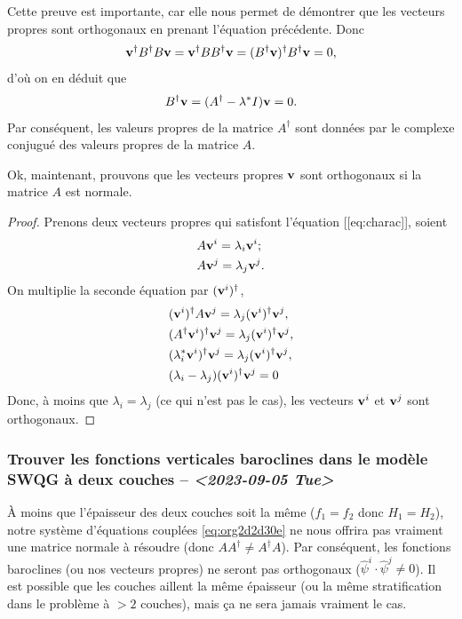 \documentclass[10pt]{article}
\numberwithin{equation}{section}
\newcommand{\vv}{\vb{v}}
\begin{document}
Cette preuve est importante, car elle nous permet de démontrer que les vecteurs propres sont orthogonaux en prenant l'équation précédente.
Donc
\begin{equation}
   \vv^\dagger B^\dagger B \vv = \vv^\dagger BB^\dagger \vv = (B^\dagger \vv)^\dagger B^\dagger \vv = 0,
\end{equation}
d'où on en déduit que
\begin{equation}
   B^\dagger \vv = (A^\dagger -\lambda^* I ) \vv = 0.
\end{equation}
Par conséquent, les valeurs propres de la matrice \(A^\dagger\) sont données par le complexe conjugué des valeurs propres de la matrice \(A\). \bigskip

Ok, maintenant, prouvons que les vecteurs propres \(\vv\) sont orthogonaux si la matrice \(A\) est normale.
\begin{proof}
Prenons deux vecteurs propres qui satisfont l'équation [[eq:charac]], soient
\begin{subequations}
\begin{align}
   &A \vv^i = \lambda_i\vv^i;\\
   &A \vv^j = \lambda_j\vv^j.
\end{align}
\end{subequations}
On multiplie la seconde équation par $(\vv^i)^\dagger$,
\begin{align}
   & (\vv^i)^\dagger A\vv^j = \lambda_j(\vv^i)^\dagger\vv^j,\nonumber\\
   & (A^\dagger\vv^i)^\dagger\vv^j = \lambda_j(\vv^i)^\dagger\vv^j,\nonumber\\
   & (\lambda_i^*\vv^i)^\dagger\vv^j = \lambda_j(\vv^i)^\dagger\vv^j,\nonumber\\
   & (\lambda_i - \lambda_j) (\vv^i)^\dagger\vv^j = 0
\end{align}
Donc, à moins que $\lambda_i = \lambda_j$ (ce qui n'est pas le cas), les vecteurs $\vv^i$ et $\vv^j$ sont orthogonaux. \end{proof}
\subsubsection{Trouver les fonctions verticales baroclines dans le modèle SWQG à deux couches -- \textit{<2023-09-05 Tue>}}
\label{sec:org4093009}

À moins que l'épaisseur des deux couches soit la même (\(f_1 = f_2\) donc \(H_1 = H_2\)), notre système d'équations couplées \ref{eq:org2d2d30e} ne nous offrira pas vraiment une matrice normale à résoudre (donc \(AA^\dagger\not=A^\dagger A\)).
Par conséquent, les fonctions baroclines (ou nos vecteurs propres) ne seront pas orthogonaux (\(\hat{\psi}^i \cdot \hat{\psi}^j \not= 0\)).
Il est possible que les couches aillent la même épaisseur (ou la même stratification dans le problème à \(>2\) couches), mais ça ne sera jamais vraiment le cas.\bigskip
\end{document}
